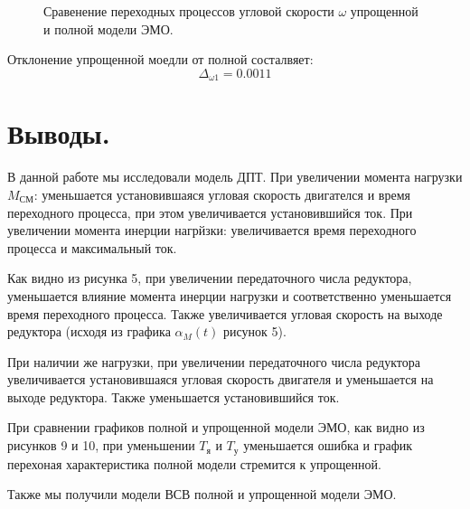 \documentclass[a4paper, 11pt]{article}
\begin{document}
\begin{figure}[h!]
    \centering
    \caption{Сравенение переходных процессов угловой скорости $\omega$ упрощенной и полной модели ЭМО.}
\end{figure}

Отклонение упрощенной моедли от полной состалвяет:
\begin{equation}
    \Delta_{\omega1} = 0.0011
\end{equation}

\newpage
\section*{Выводы.}
В данной работе мы исследовали модель ДПТ. При увеличении момента нагрузки $M_\text{СМ}$: уменьшается установившаяся угловая скорость двигателся и время переходного процесса, при этом увеличивается установившийся ток. При увеличении момента инерции нагрйзки: увеличивается время переходного процесса и максимальный ток. \par
Как видно из рисунка 5, при увеличении передаточного числа редуктора, уменьшается влияние момента инерции нагрузки и соответственно уменьшается время переходного процесса. Также увеличивается угловая скорость на выходе редуктора (исходя из графика $\alpha_M(t)$ рисунок 5). \par
При наличии же нагрузки, при увеличении передаточного числа редуктора увеличивается установившаяся угловая скорость двигателя и уменьшается на выходе редуктора. Также уменьшается установившийся ток. \par
При сравнении графиков полной и упрощенной модели ЭМО, как видно из рисунков 9 и 10, при уменьшении $T_\text{я}$ и $T_\text{у}$ уменьшается ошибка и график перехоная характеристика полной модели стремится к упрощенной. \par
Также мы получили модели ВСВ полной и упрощенной модели ЭМО. 
\end{document}
